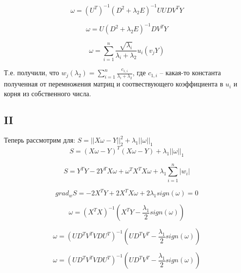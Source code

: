 \documentclass[a4paper,14pt]{article} %
\begin{document}
\begin{equation}
    \omega = (U^T)^{-1}(D^2 + \lambda_2 E)^{-1}UUDV^TY
\end{equation}

\begin{equation}
    \omega = U(D^2 + \lambda_2 E)^{-1}DV^TY
\end{equation}

\begin{equation}
    \omega = \sum\limits_{i = 1}^n\frac{\sqrt{\lambda_i}}{\lambda_i + \lambda_2}u_i(v_jY)
\end{equation}

Т.е. получили, что $w_j(\lambda_2) = \sum\limits_{i = 1}^n \frac{c_{1, i}}{\lambda_i + \lambda_2}$, где $c_{1, i}$ -- какая-то константа полученная от перемножения матриц и соотвествующего коэффициента в $u_i$ и корня из собственного числа.

\subsection{II}
Теперь рассмотрим для: $S = ||X\omega - Y||_2^2 + \lambda_1||\omega||_1$
\begin{equation}
    S = (X\omega - Y)^T(X\omega - Y) + \lambda_1||\omega||_1
\end{equation}

\begin{equation}
    S = Y^TY - 2Y^TX\omega + \omega^TX^TX\omega + \lambda_1 \sum\limits_{i = 1}^n |w_i|
\end{equation}


\begin{equation}
    grad_wS = -2X^TY+2X^TX\omega + 2\lambda_1 sign(\omega)   = 0
\end{equation}


\begin{equation}
    \omega = (X^TX)^{-1}(X^TY - \frac{\lambda_1}{2} sign(\omega))
\end{equation}

\begin{equation}
    \omega = (UD^TV^TVDU^T)^{-1}(UD^TV^T - \frac{\lambda_1}{2}sign(\omega))
\end{equation}

\begin{equation}
    \omega = (UD^TV^TVDU^T)^{-1}(UD^TV^T - \frac{\lambda_1}{2}sign(\omega))
\end{equation}
\end{document}
